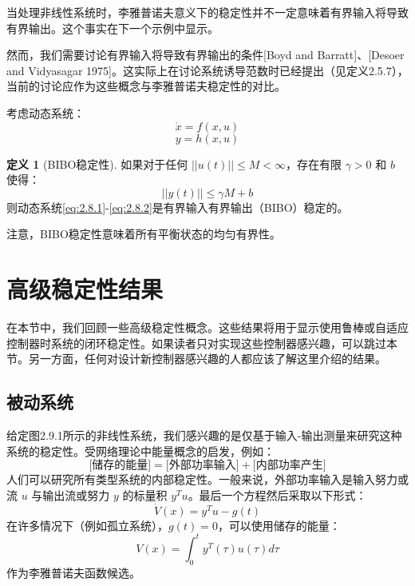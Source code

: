 \documentclass[UTF8,12pt,a4paper]{ctexart}
\theoremstyle{definition}
\newtheorem{definition}{定义}[section]
\begin{document}
当处理非线性系统时，李雅普诺夫意义下的稳定性并不一定意味着有界输入将导致有界输出。这个事实在下一个示例中显示。

然而，我们需要讨论有界输入将导致有界输出的条件[Boyd and Barratt]、[Desoer and Vidyasagar 1975]。这实际上在讨论系统诱导范数时已经提出（见定义2.5.7），当前的讨论应作为这些概念与李雅普诺夫稳定性的对比。

考虑动态系统：
\begin{equation}\label{eq:2.8.1}
\dot{x} = f(x, u)
\end{equation}
\begin{equation}\label{eq:2.8.2}
y = h(x, u)
\end{equation}

\begin{definition}[BIBO稳定性]
如果对于任何 $||u(t)|| \leq M < \infty$，存在有限 $\gamma > 0$ 和 $b$ 使得：
\[
||y(t)|| \leq \gamma M + b
\]
则动态系统\eqref{eq:2.8.1}-\eqref{eq:2.8.2}是有界输入有界输出（BIBO）稳定的。
\end{definition}

注意，BIBO稳定性意味着所有平衡状态的均匀有界性。

\section{高级稳定性结果}

在本节中，我们回顾一些高级稳定性概念。这些结果将用于显示使用鲁棒或自适应控制器时系统的闭环稳定性。如果读者只对实现这些控制器感兴趣，可以跳过本节。另一方面，任何对设计新控制器感兴趣的人都应该了解这里介绍的结果。

\subsection{被动系统}

给定图2.9.1所示的非线性系统，我们感兴趣的是仅基于输入-输出测量来研究这种系统的稳定性。受网络理论中能量概念的启发，例如：
\[
\text{[储存的能量]} = \text{[外部功率输入]} + \text{[内部功率产生]}
\]
人们可以研究所有类型系统的内部稳定性。一般来说，外部功率输入是输入努力或流 $u$ 与输出流或努力 $y$ 的标量积 $y^T u$。最后一个方程然后采取以下形式：
\begin{equation}\label{eq:2.9.1}
\dot{V}(x) = y^T u - g(t)
\end{equation}
在许多情况下（例如孤立系统），$g(t)=0$，可以使用储存的能量：
\begin{equation}\label{eq:2.9.2}
V(x) = \int_0^t y^T(\tau)u(\tau) d\tau
\end{equation}
作为李雅普诺夫函数候选。
\end{document}
